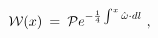 \begin{equation} \label{ghat}
  {\cal W}(x) \: = \: \mathcal{P} e^{-\frac{1}{4}\int^x \hat\omega \cdot dl} \ ,
\end{equation}

